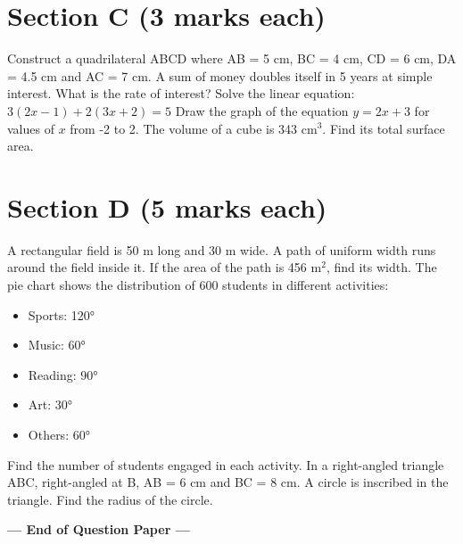 \documentclass[11pt,a4paper]{exam}
\begin{document}
	\section*{Section C (3 marks each)}
	\begin{questions}
		\question Construct a quadrilateral ABCD where AB = 5 cm, BC = 4 cm, CD = 6 cm, DA = 4.5 cm and AC = 7 cm.
		\question A sum of money doubles itself in 5 years at simple interest. What is the rate of interest?
		\question Solve the linear equation: $3(2x-1) + 2(3x+2) = 5$
		\question Draw the graph of the equation $y = 2x + 3$ for values of $x$ from -2 to 2.
		\question The volume of a cube is 343 cm$^3$. Find its total surface area.
	\end{questions}
	
	\section*{Section D (5 marks each)}
	\begin{questions}
		\question A rectangular field is 50 m long and 30 m wide. A path of uniform width runs around the field inside it. If the area of the path is 456 m$^2$, find its width.
		\question The pie chart shows the distribution of 600 students in different activities:
		\begin{itemize}
			\item Sports: 120°
			\item Music: 60°
			\item Reading: 90°
			\item Art: 30°
			\item Others: 60°
		\end{itemize}
		Find the number of students engaged in each activity.
		\question In a right-angled triangle ABC, right-angled at B, AB = 6 cm and BC = 8 cm. A circle is inscribed in the triangle. Find the radius of the circle.
	\end{questions}
	
	\begin{center}
		\textbf{--- End of Question Paper ---}
	\end{center}
	
\end{document}
